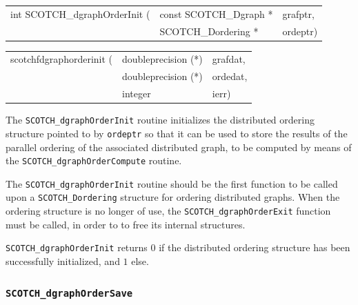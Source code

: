 \begin{itemize}
\progsyn

{\tt\begin{tabular}{l@{}ll}
int SCOTCH\_dgraphOrderInit ( & const SCOTCH\_Dgraph * & grafptr, \\
                              & SCOTCH\_Dordering *    & ordeptr)
\end{tabular}}

{\tt\begin{tabular}{l@{}ll}
scotchfdgraphorderinit ( & doubleprecision (*) & grafdat, \\
                         & doubleprecision (*) & ordedat, \\
                         & integer             & ierr)
\end{tabular}}

\progdes

The {\tt SCOTCH\_dgraph\lbt Order\lbt Init} routine initializes the
distributed ordering structure pointed to by {\tt ordeptr} so that it
can be used to store the results of the parallel ordering of the
associated distributed graph, to be computed by means of the
{\tt SCOTCH\_\lbt dgraph\lbt Order\lbt Compute} routine.

The {\tt SCOTCH\_\lbt dgraph\lbt Order\lbt Init} routine should be the
first function to be called upon a {\tt SCOTCH\_\lbt Dordering}
structure for ordering distributed graphs. When the ordering structure
is no longer of use, the {\tt SCOTCH\_\lbt dgraph\lbt Order\lbt Exit}
function must be called, in order to to free its internal structures.

\progret

{\tt SCOTCH\_dgraphOrderInit} returns $0$ if the distributed ordering
structure has been successfully initialized, and $1$ else.
\end{itemize}

\subsubsection{{\tt SCOTCH\_dgraphOrderSave}}


